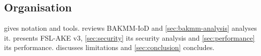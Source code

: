 \subsection{Organisation}
 gives notation and tools.  reviews BAKMM-IoD and \cref{sec:bakmm-analysis} analyses it.
 presents FSL-AKE v3, \cref{sec:security} its security analysis and \cref{sec:performance} its performance.
 discusses limitations and \cref{sec:conclusion} concludes.
